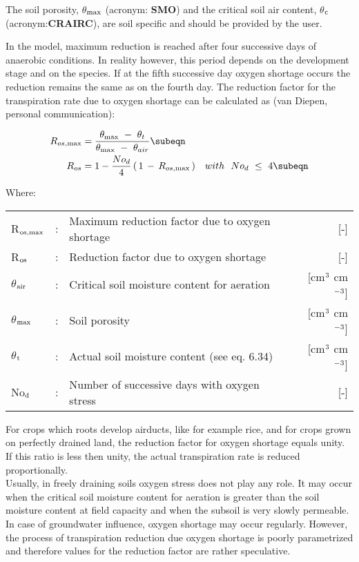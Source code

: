 The soil porosity, {\bf $\theta$$_{{\rm max}}$} (acronym: {\bf SMO}) and the critical soil air 
content, {\bf $\theta$$_{{\rm c}}$} (acronym:{\bf CRAIRC}), are soil specific and should 
be provided by the user. 

In the model, maximum reduction is reached after four successive days of anaerobic
conditions. In reality however, this period depends on the development stage and on the
species. If at the fifth successive day oxygen shortage occurs the reduction remains the
same as on the fourth day. The reduction factor for the transpiration rate due to oxygen
shortage can be calculated as (van Diepen, personal communication):

\begin{align}
R_{os,\max } &= \frac{ \theta  _{\max } ~-~ \theta  _{t} }{\theta _{\max } ~-~ \theta  _{air} } \subeqn  \\
R_{os} &= 1 - \frac{No _{d} }{4} \, (\, 1\, -\, R _{os,\max } \, ) ~~~ with~~ No_{d} ~\le ~ 4 \subeqn
\end{align}

Where:\\[5pt]
\begin{tabularx}{\textwidth}{llXr}
 R$_{{\rm os,max}}$ &:& Maximum reduction factor due to oxygen shortage & [-]\\
 R$_{{\rm os}}$ &:& Reduction factor due to oxygen shortage & [-]\\
 $\theta$$_{{\rm air}}$ &:& Critical soil moisture content for aeration & [cm$^{{\rm 3}}$ cm$^{{\rm -3}}$]\\
 $\theta$$_{{\rm max}}$ &:& Soil porosity & [cm$^{{\rm 3}}$ cm$^{{\rm -3}}$]\\
 $\theta$$_{{\rm t}}$ &:& Actual soil moisture content (see eq. 6.34) & [cm$^{{\rm 3}}$ cm$^{{\rm -3}}$]\\
 No$_{{\rm d}}$ &:& Number of successive days with oxygen stress & [-]\\
\end{tabularx}

For crops which roots develop airducts, like for example rice, and for crops grown on
perfectly drained land, the reduction factor for oxygen shortage equals unity. If this ratio
is less then unity, the actual transpiration rate is reduced proportionally. \\

Usually, in freely draining soils oxygen stress does not play any role. It may occur when
the critical soil moisture content for aeration is greater than the soil moisture content at
field capacity and when the subsoil is very slowly permeable. In case of groundwater
influence, oxygen shortage may occur regularly. However, the process of transpiration
reduction due oxygen shortage is poorly parametrized and therefore values for the
reduction factor are rather speculative. 

